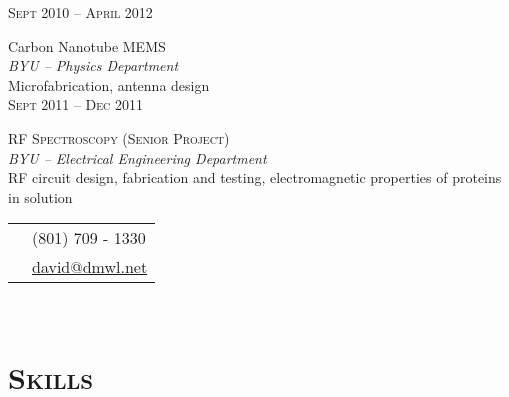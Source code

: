 \documentclass[10pt]{article}
\begin{document}
{\begin{minipage}[t]{0.5\textwidth}

	\raggedleft
	\textsc{\normalsize Sept 2010 -- April 2012}\par

	\raggedright\large Carbon Nanotube MEMS\\
	\emph{BYU -- Physics Department}\\[5pt]

  \normalsize{Microfabrication, antenna design}\\[10pt]


	\raggedleft
	\textsc{\normalsize Sept 2011 -- Dec 2011}\par

	\raggedright\large \textsc{RF Spectroscopy (Senior Project)}\\
  \emph{BYU -- Electrical Engineering Department}\\[5pt]
  \normalsize{RF circuit design, fabrication and testing, electromagnetic properties of proteins in solution
  }\\[10pt]


\end{minipage} %
\hfill
\begin{minipage}[t]{0.44\textwidth} %
	
	\vspace{0pt} %
	
\colorbox{shade}{\textcolor{text1}{
	\begin{tabular}{c|p{7cm}}
		\raisebox{-3pt}{\Phone}  		&(801) 709 - 1330\\
		\raisebox{-3pt}{\Envelope} 	&\href{mailto:david@dmwl.net}
								{david@dmwl.net}
	\end{tabular}
	}
}\\[10pt]

\section{\textsc{Skills}}


\end{minipage}}
\end{document}
